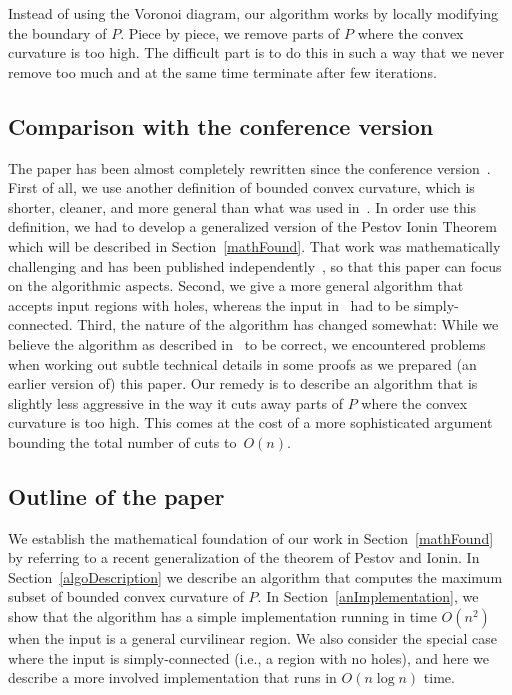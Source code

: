 \documentclass{article}
\newcommand{\PP}{P}
\begin{document}
Instead of using the Voronoi diagram, our algorithm works by locally modifying the boundary of $\PP$.
Piece by piece, we remove parts of $\PP$ where the convex curvature is too high.
The difficult part is to do this in such a way that we never remove too much and at the same time terminate after few iterations.

\subsection{Comparison with the conference version}

The paper has been almost completely rewritten since the conference version~\cite{abrahamsen_et_al:LIPIcs:2016:5896}.
First of all, we use another definition of bounded convex curvature, which is shorter, cleaner, and more general than what was used in~\cite{abrahamsen_et_al:LIPIcs:2016:5896}.
In order use this definition, we had to develop a generalized version of the Pestov Ionin Theorem which will be described in Section~\ref{mathFound}.
That work was mathematically challenging and has been published independently~\cite{aam2019disks}, so that this paper can focus on the algorithmic aspects.
Second, we give a more general algorithm that accepts input regions with holes, whereas the input in~\cite{abrahamsen_et_al:LIPIcs:2016:5896} had to be simply-connected.
Third, the nature of the algorithm has changed somewhat:
While we believe the algorithm as described in~\cite{abrahamsen_et_al:LIPIcs:2016:5896} to be correct, we encountered problems when working out subtle technical details in some proofs as we prepared (an earlier version of) this paper.
Our remedy is to describe an algorithm that is slightly less aggressive in the way it cuts away parts of $\PP$ where the convex curvature is too high.
This comes at the cost of a more sophisticated argument bounding the total number of cuts to~$O(n)$.

\subsection{Outline of the paper}
We establish the mathematical foundation of our work in Section~\ref{mathFound} by referring to a recent generalization of the theorem of Pestov and Ionin.
In Section~\ref{algoDescription} we describe an algorithm that computes the maximum subset of bounded convex curvature of $\PP$.
In Section~\ref{anImplementation}, we show that the algorithm has a simple implementation running in time $O(n^2)$ when the input is a general curvilinear region.
We also consider the special case where the input is simply-connected (i.e., a region with no holes), and here we describe a more involved implementation that runs in $O(n\log n)$ time.
\end{document}
